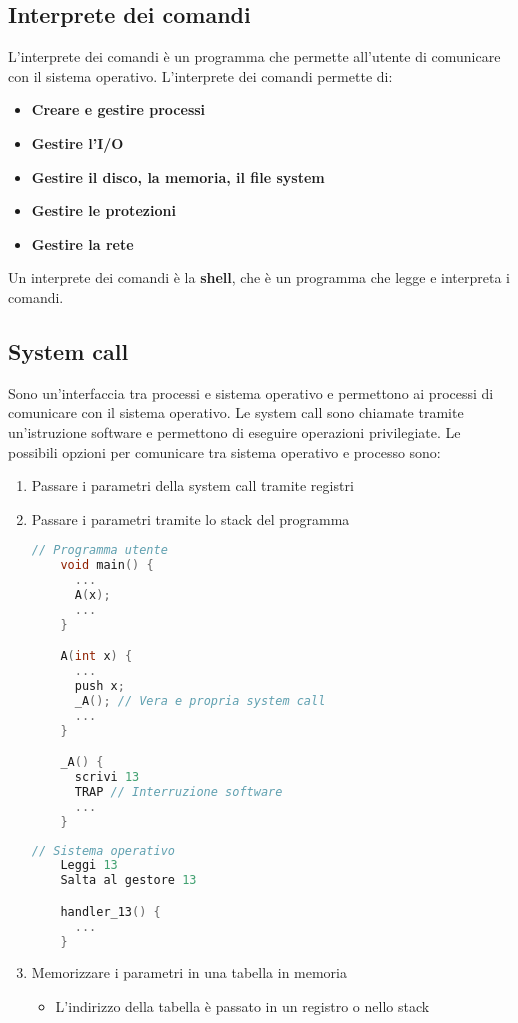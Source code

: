 \documentclass[a4paper]{article}
\begin{document}
\subsection{Interprete dei comandi}
L'interprete dei comandi è un programma che permette all'utente di comunicare con il
sistema operativo. L'interprete dei comandi permette di:
\begin{itemize}
  \item \textbf{Creare e gestire processi}
  \item \textbf{Gestire l'I/O}
  \item \textbf{Gestire il disco, la memoria, il file system}
  \item \textbf{Gestire le protezioni}
  \item \textbf{Gestire la rete}
\end{itemize}
Un interprete dei comandi è la \textbf{shell}, che è un programma che legge e interpreta i comandi.

\subsection{System call}
Sono un'interfaccia tra processi e sistema operativo e permettono ai processi di
comunicare con il sistema operativo. Le system call sono chiamate tramite un'istruzione
software e permettono di eseguire operazioni privilegiate. Le possibili opzioni per
comunicare tra sistema operativo e processo sono:
\begin{enumerate}
  \item Passare i parametri della system call tramite registri
  \item Passare i parametri tramite lo stack del programma
    \begin{lstlisting}[language=C]
    // Programma utente
    void main() {
      ...
      A(x);
      ...
    }

    A(int x) {
      ...
      push x;
      _A(); // Vera e propria system call
      ...
    }

    _A() {
      scrivi 13
      TRAP // Interruzione software
      ...
    }
    \end{lstlisting}
    \begin{lstlisting}[language=C]
    // Sistema operativo
    Leggi 13
    Salta al gestore 13

    handler_13() {
      ...
    }
    \end{lstlisting}
  \item Memorizzare i parametri in una tabella in memoria
    \begin{itemize}
      \item L'indirizzo della tabella è passato in un registro o nello stack
    \end{itemize}
\end{enumerate}
\end{document}
